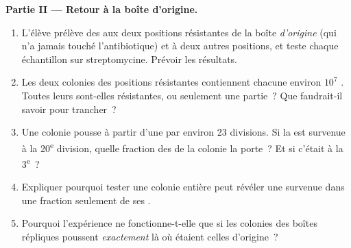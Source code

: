 \begin{problem}
\medskip
\noindent\textbf{Partie II --- Retour à la boîte d'origine.}
\begin{enumerate}[resume]
  \item L'élève prélève des  aux deux positions résistantes de
        la boîte \emph{d'origine} (qui n'a jamais touché
        l'antibiotique) et à deux autres positions, et teste chaque
        échantillon sur streptomycine. Prévoir les résultats.
  \item Les deux colonies des positions résistantes contiennent chacune
        environ $10^7$ . Toutes leurs  sont-elles
        résistantes, ou seulement une partie~? Que faudrait-il savoir
        pour trancher~?
  \item Une colonie pousse à partir d'une  par environ 23
        divisions. Si la  est survenue à la 20\textsuperscript{e}
        division, quelle fraction des  de la colonie la
        porte~? Et si c'était à la 3\textsuperscript{e}~?
  \item Expliquer pourquoi tester une colonie entière peut révéler une
         survenue dans une fraction seulement de ses .
  \item Pourquoi l'expérience ne fonctionne-t-elle que si les colonies
        des boîtes répliques poussent \emph{exactement} là où étaient
        celles d'origine~?
\end{enumerate}


\end{problem}
